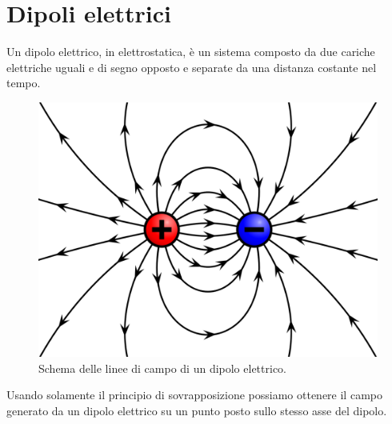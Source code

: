 \documentclass[
10pt, %
a4paper, %
oneside, %
headinclude,footinclude, %
BCOR5mm, %
]{scrartcl}
\begin{document}
\section{Dipoli elettrici}
\begin{definizione}
	Un dipolo elettrico, in elettrostatica, è un sistema composto da due cariche elettriche uguali e di segno opposto e separate da una distanza costante nel tempo.
\end{definizione}
\begin{figure}[h!]
	\centering
	\includegraphics[width=0.4\linewidth]{images/dipolo_elettrico}
	\caption{Schema delle linee di campo di un dipolo elettrico.}
	\label{fig:dipoloelettrico}
\end{figure}
\FloatBarrier
Usando solamente il principio di sovrapposizione possiamo ottenere il campo generato da un dipolo elettrico su un punto posto sullo stesso asse del dipolo.
\end{document}
